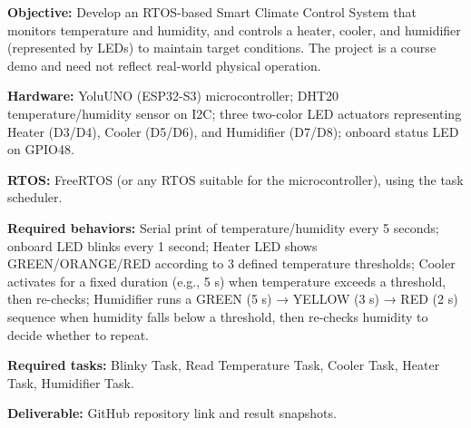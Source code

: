 \documentclass[11pt,letterpaper]{article}
\begin{document}
\textbf{Objective:}
Develop an RTOS-based Smart Climate Control System that monitors temperature and humidity, and controls a heater, cooler, and humidifier (represented by LEDs) to maintain target conditions. The project is a course demo and need not reflect real-world physical operation.

\textbf{Hardware:}
YoluUNO (ESP32-S3) microcontroller; DHT20 temperature/humidity sensor on I2C; three two-color LED actuators representing Heater (D3/D4), Cooler (D5/D6), and Humidifier (D7/D8); onboard status LED on GPIO48.

\textbf{RTOS:}
FreeRTOS (or any RTOS suitable for the microcontroller), using the task scheduler.

\textbf{Required behaviors:}
Serial print of temperature/humidity every 5 seconds; onboard LED blinks every 1 second; Heater LED shows GREEN/ORANGE/RED according to 3 defined temperature thresholds; Cooler activates for a fixed duration (e.g., 5 s) when temperature exceeds a threshold, then re-checks; Humidifier runs a GREEN (5 s) → YELLOW (3 s) → RED (2 s) sequence when humidity falls below a threshold, then re-checks humidity to decide whether to repeat.

\textbf{Required tasks:}
Blinky Task, Read Temperature Task, Cooler Task, Heater Task, Humidifier Task.

\textbf{Deliverable:}
GitHub repository link and result snapshots.

\clearpage


\clearpage


\clearpage


\clearpage


\clearpage

\end{document}
